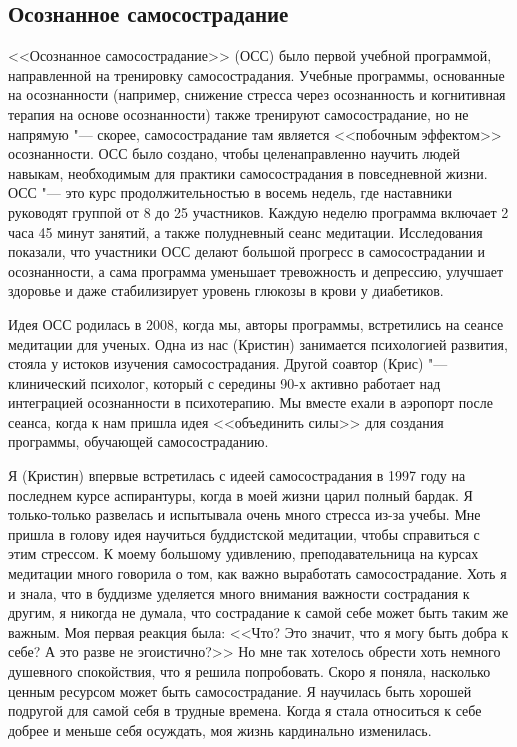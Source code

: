 	
	\subsection*{Осознанное самосострадание}
	
	<<Осознанное самосострадание>> (ОСС) было первой учебной программой, направленной на тренировку самосострадания. Учебные программы, основанные на осознанности (например, снижение стресса через осознанность и когнитивная терапия на основе осознанности) также тренируют самосострадание, но не напрямую "--- скорее, самосострадание там является <<побочным эффектом>> осознанности. ОСС было создано, чтобы целенаправленно научить людей навыкам, необходимым для практики самосострадания в повседневной жизни. ОСС "--- это курс продолжительностью в восемь недель, где наставники руководят группой от 8 до 25 участников. Каждую неделю программа включает 2 часа 45 минут занятий, а также полудневный сеанс медитации. Исследования показали, что участники ОСС делают большой прогресс в самосострадании и осознанности, а сама программа уменьшает тревожность и депрессию, улучшает здоровье и даже стабилизирует уровень глюкозы в крови у диабетиков.
	
	Идея ОСС родилась в 2008, когда мы, авторы программы, встретились на сеансе  медитации для ученых. Одна из нас (Кристин) занимается психологией развития, стояла у истоков изучения самосострадания. Другой соавтор (Крис) "--- клинический психолог, который с середины 90-х активно работает над интеграцией осознанности в психотерапию. Мы вместе ехали в аэропорт после сеанса, когда к нам пришла идея <<объединить силы>> для создания программы, обучающей самосостраданию.
	
	Я (Кристин) впервые встретилась с идеей самосострадания в 1997 году на последнем курсе аспирантуры, когда в моей жизни царил полный бардак. Я только-только развелась и испытывала очень много стресса из-за учебы. Мне пришла в голову идея научиться буддистской медитации, чтобы справиться с этим стрессом. К моему большому удивлению, преподавательница на курсах медитации много говорила о том, как важно выработать самосострадание. Хоть я и знала, что в буддизме уделяется много внимания важности сострадания к другим, я никогда не думала, что сострадание к самой себе может быть таким же важным. Моя первая реакция была: <<Что? Это значит, что я могу быть добра к себе? А это разве не эгоистично?>> Но мне так хотелось обрести хоть немного душевного спокойствия, что я решила попробовать. Скоро я поняла, насколько ценным ресурсом может быть самосострадание. Я научилась быть хорошей подругой для самой себя в трудные времена. Когда я стала относиться к себе добрее и меньше себя осуждать, моя жизнь кардинально изменилась. 
	
